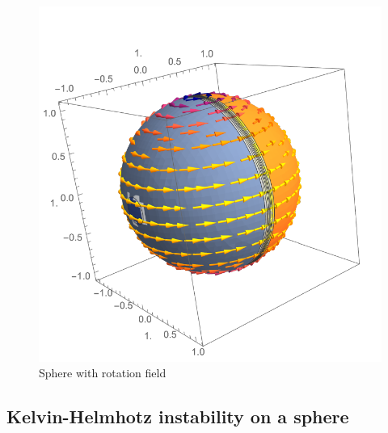 \documentclass{article}
\begin{document}
\begin{figure}[h]
	\centering
	\includegraphics[scale=0.5]{images/rotation.pdf}
	\caption{Sphere with rotation field}
	\label{fig:rotation}
\end{figure}

\subsection{Kelvin-Helmhotz instability on a sphere}
\end{document}
